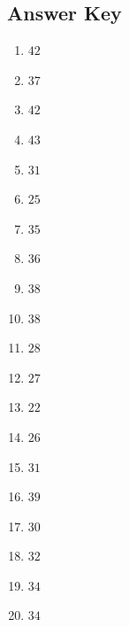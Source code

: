 \documentclass{article}
\begin{document}
\newpage

\subsection*{Answer Key}

\begin{enumerate}
\item $\displaystyle 42 $ \ 
\item $\displaystyle 37 $ \ 
\item $\displaystyle 42 $ \ 
\item $\displaystyle 43 $ \ 
\item $\displaystyle 31 $ \ 
\item $\displaystyle 25 $ \ 
\item $\displaystyle 35 $ \ 
\item $\displaystyle 36 $ \ 
\item $\displaystyle 38 $ \ 
\item $\displaystyle 38 $ \ 
\item $\displaystyle 28 $ \ 
\item $\displaystyle 27 $ \ 
\item $\displaystyle 22 $ \ 
\item $\displaystyle 26 $ \ 
\item $\displaystyle 31 $ \ 
\item $\displaystyle 39 $ \ 
\item $\displaystyle 30 $ \ 
\item $\displaystyle 32 $ \ 
\item $\displaystyle 34 $ \ 
\item $\displaystyle 34 $ \ 

\end{enumerate}
\end{document}
